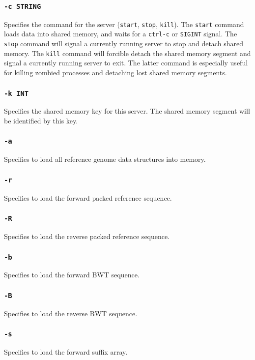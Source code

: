 \documentclass[a4paper,12pt]{book}
\newcommand{\TT}[1]{{\tt #1}} %
\begin{document}
\subsubsection{\TT{-c STRING}}
Specifies the command for the server (\TT{start}, \TT{stop}, \TT{kill}).
The \TT{start} command loads data into shared memory, and waits for a \TT{ctrl-c} or \TT{SIGINT} signal.
The \TT{stop} command will signal a currently running server to stop and detach shared memory.
The \TT{kill} command will forcible detach the shared memory segment and signal a currently running server to exit.
The latter command is especially useful for killing zombied processes and detaching lost shared memory segments.

\subsubsection{\TT{-k INT}}
Specifies the shared memory key for this server.
The shared memory segment will be identified by this key.

\subsubsection{\TT{-a}}
Specifies to load all reference genome data structures into memory.

\subsubsection{\TT{-r}}
Specifies to load the forward packed reference sequence.

\subsubsection{\TT{-R}}
Specifies to load the reverse packed reference sequence.

\subsubsection{\TT{-b}}
Specifies to load the forward BWT sequence.

\subsubsection{\TT{-B}}
Specifies to load the reverse BWT sequence.

\subsubsection{\TT{-s}}
Specifies to load the forward suffix array.
\end{document}
